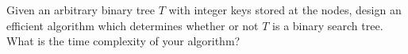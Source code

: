Given an arbitrary binary tree $T$ with integer keys stored at the
nodes, design an efficient algorithm which determines whether or not
$T$ is a binary search tree.  What is the time complexity of your
algorithm?
